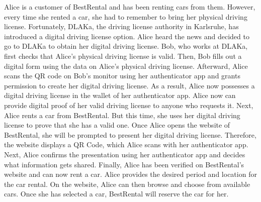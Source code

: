 Alice is a customer of BestRental and has been renting cars from them.
However, every time she rented a car, she had to remember to bring her physical driving license.
Fortunately, DLAKa, the driving license authority in Karlsruhe, 
has introduced a digital driving license option. Alice heard the news and decided to go
to DLAKa to obtain her digital driving license. Bob, who works at DLAKa,
first checks that Alice's physical driving license is valid. Then, Bob fills out a digital form
using the data on Alice's physical driving license. Afterward, Alice scans the QR code on Bob's monitor
using her authenticator app and grants permission to create her digital driving license.
As a result, Alice now possesses a digital driving license in the wallet of her authenticator app.
Alice now can provide digital proof of her valid driving license to anyone who requests it.
Next, Alice rents a car from BestRental. But this time, she uses her digital driving license
to prove that she has a valid one. Once Alice opens the website of BestRental,
she will be prompted to present her digital driving license. Therefore, the website displays a QR Code,
which Alice scans with her authenticator app. Next, Alice confirms the presentation using
her authenticator app and decides what information gets shared. 
Finally, Alice has been verified on BestRental's website and can now rent a car. 
Alice provides the desired period and location for the car rental.
On the website, Alice can then browse and choose from available cars.
Once she has selected a car, BestRental will reserve the car for her.

